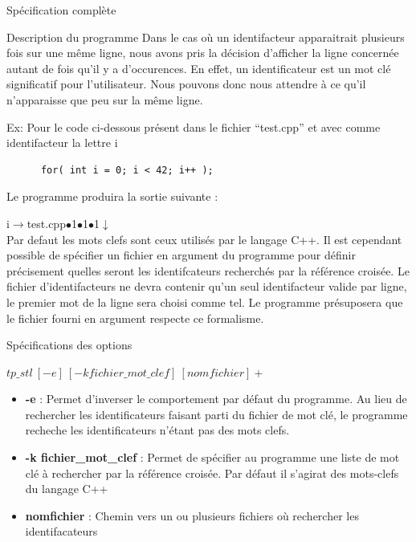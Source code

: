 \documentclass{article}
\begin{document}
\begin{section}{Spécification complète}
\begin{subsection}{Description du programme}
    Dans le cas où un identifacteur apparaitrait plusieurs fois sur une même ligne, nous avons pris la décision d'afficher
    la ligne concernée autant de fois qu'il y a d'occurences. En effet, un identificateur est un mot clé significatif pour l'utilisateur.
    Nous pouvons donc nous attendre à ce qu'il n'apparaisse que peu sur la même ligne.
    
    Ex: Pour le code ci-dessous présent dans le fichier ``test.cpp'' et avec comme identifacteur la lettre i 
    
    \begin{verbatim}
      for( int i = 0; i < 42; i++ );
    \end{verbatim}
    Le programme produira la sortie suivante : 

    i$\xrightarrow{}$test.cpp$\bullet$1$\bullet$1$\bullet$1$\downarrow$ \\
    
    Par defaut les mots clefs sont ceux utilisés par le langage C++. Il est cependant possible de spécifier
    un fichier en argument du programme pour définir précisement quelles seront les identifcateurs recherchés par la référence
    croisée. Le fichier d'identifacteurs ne devra contenir qu'un seul identifacteur valide par ligne, le premier mot de la ligne sera choisi comme tel. Le programme présuposera que
    le fichier fourni en argument respecte ce formalisme.
    
    
  \end{subsection}

  
  \begin{subsection}{Spécifications des options}
    \begin{center}
      \textbf{$tp\_stl\ [-e]\ [-k fichier\_mot\_clef]\ [nomfichier]+$}
    \end{center}

    \begin{itemize}
      \item[] \textbf{-e} : Permet d'inverser le comportement par défaut du programme.
			    Au lieu de rechercher les identificateurs faisant parti du fichier de mot clé, le programme recheche
			    les identificateurs n'étant pas des mots clefs.

      
      \item[] \textbf{-k fichier\_mot\_clef} : Permet de spécifier au programme une liste de mot clé à rechercher par la référence croisée.
					       Par défaut il s'agirat des mots-clefs du langage C++ 

      \item[] \textbf{nomfichier} : Chemin vers un ou plusieurs fichiers où rechercher les identifacateurs
    \end{itemize}

  \end{subsection}

\end{section}
\end{document}

